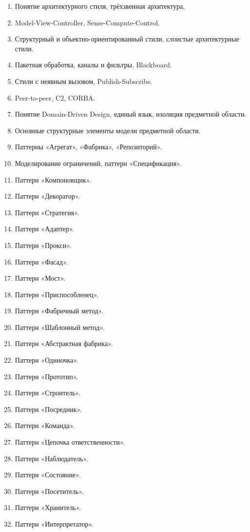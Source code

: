 \documentclass[a5paper]{article}
\begin{document}
\begin{enumerate}
    \item Понятие архитектурного стиля, трёхзвенная архитектура, 
    \item Model-View-Controller, Sense-Compute-Control.
    \item Структурный и объектно-ориентированный стили, слоистые архитектурные стили.
    \item Пакетная обработка, каналы и фильтры, Blackboard.
    \item Стили с неявным вызовом, Publish-Subscribe.
    \item Peer-to-peer, C2, CORBA.
    \item Понятие Domain-Driven Design, единый язык, изоляция предметной области.
    \item Основные структурные элементы модели предметной области.
    \item Паттерны «Агрегат», «Фабрика», «Репозиторий».
    \item Моделирование ограничений, паттерн «Спецификация».
    \item Паттерн «Компоновщик».
    \item Паттерн «Декоратор».
    \item Паттерн «Стратегия».
    \item Паттерн «Адаптер».
    \item Паттерн «Прокси».
    \item Паттерн «Фасад».
    \item Паттерн «Мост».
    \item Паттерн «Приспособленец».
    \item Паттерн «Фабричный метод».
    \item Паттерн «Шаблонный метод».
    \item Паттерн «Абстрактная фабрика».
    \item Паттерн «Одиночка».
    \item Паттерн «Прототип».
    \item Паттерн «Строитель».
    \item Паттерн «Посредник».
    \item Паттерн «Команда».
    \item Паттерн «Цепочка ответственности».
    \item Паттерн «Наблюдатель».
    \item Паттерн «Состояние».
    \item Паттерн «Посетитель».
    \item Паттерн «Хранитель».
    \item Паттерн «Интерпретатор».

\end{enumerate}
\end{document}
